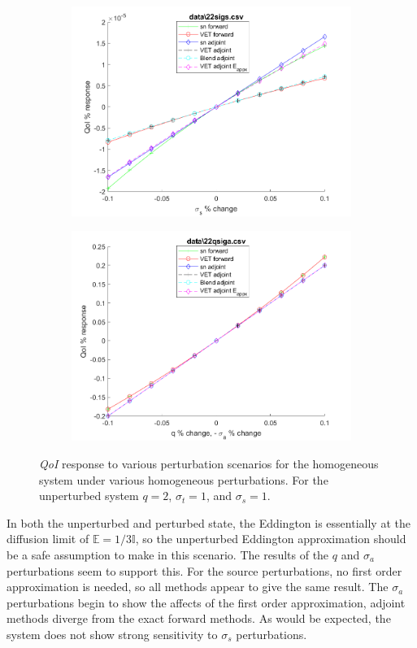 \documentclass[12pt]{report}
\newcommand{\Edd}{\mathbb{E}}
\newcommand{\sigt}{\sigma_t}
\newcommand{\sigs}{\sigma_s}
\newcommand{\siga}{\sigma_a}
\newcommand{\qoi}{{\it QoI}\xspace}
\begin{document}
\begin{figure}[H]
\begin{subfigure}{.5\textwidth}
  \includegraphics[width=.98\linewidth]{figures2/22sigsSens.png}
  \label{T1:sfig3}
\end{subfigure}%
\begin{subfigure}{.5\textwidth}
  \centering
  \includegraphics[width=.98\linewidth]{figures2/22qsigaSens.png}
  \label{T1:sfig4}
\end{subfigure}
\caption{\qoi response to various perturbation scenarios for the homogeneous system under various homogeneous perturbations. For the unperturbed system $q=2$, $\sigt=1$, and $\sigs=1$.}
\end{figure}

In both the unperturbed and perturbed state, the Eddington is essentially at the diffusion limit of $\Edd = 1/3 \mathbb{I}$, so the unperturbed Eddington approximation should be a safe assumption to make in this scenario. The results of the $q$ and $\siga$ perturbations seem to support this. For the source perturbations, no first order approximation is needed, so all methods appear to give the same result. The $\siga$ perturbations begin to show the affects of the first order approximation, adjoint methods diverge from the exact forward methods. As would be expected, the system does not show strong sensitivity to $\sigs$ perturbations.
\end{document}

